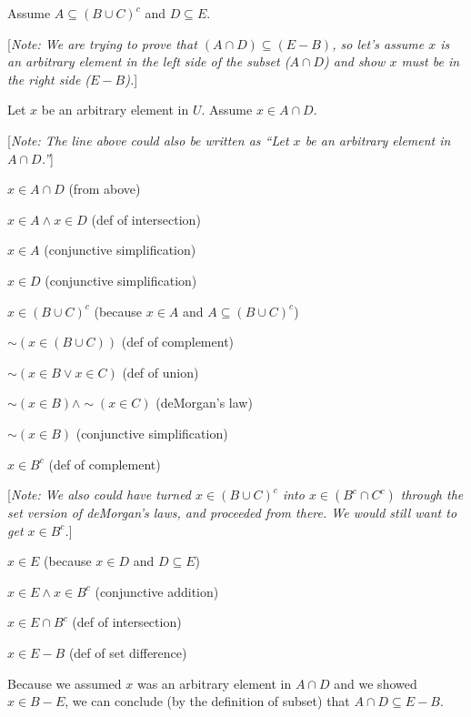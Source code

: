 \documentclass[11pt, letterpaper]{report}
\newcommand{\nott}{{\sim}}
\newcommand{\proofnote}[1]{[\textit{Note: #1}]}
\begin{document}
\begin{enumerate}
        Assume $A \subseteq (B \cup C)^c$ and $D \subseteq E$.
        
        \proofnote{We are trying to prove that $(A \cap D) \subseteq (E-B)$, so let's assume $x$ is an arbitrary element in the left side of the subset
        ($A \cap D$) and show $x$ must be in the right side ($E-B$).}
        
        Let $x$ be an arbitrary element in $U$.  Assume $x \in A \cap D$.  
        
        \proofnote{The line above could also be written as ``Let $x$ be an arbitrary element in $A\cap D$.''}

	$x \in A \cap D$ \qquad (from above)
        
    $x \in A \land  x \in D$ \qquad (def of intersection)
    
    $x \in A$ \qquad (conjunctive simplification)
    
    $x \in D$ \qquad (conjunctive simplification)
    
    $x \in (B \cup C)^c$ \qquad (because $x \in A$ and $A \subseteq (B \cup C)^c$)
    
    $\nott (x \in (B \cup C))$ \qquad (def of complement)
    
    $\nott (x \in B \lor x \in C)$ \qquad (def of union)
    
    $\nott (x \in B) \land \nott( x \in C)$ \qquad (deMorgan's law)
    
    $\nott (x \in B)$ \qquad (conjunctive simplification)
    
    $x \in B^c$ \qquad (def of complement)
    
    \proofnote{We also could have turned $x \in (B \cup C)^c$ into $x \in (B^c \cap C^c)$ through the set version of deMorgan's laws, and proceeded from there.  We would still want to get $x \in B^c$.}
    
    $x \in E$ \qquad (because $x \in D$ and $D \subseteq E$)
    
    $x \in E \land x \in B^c$ \qquad (conjunctive addition)
    
    $x \in E \cap B^c$ \qquad (def of intersection)
    
    $x \in E - B$ \qquad (def of set difference)
    
    Because we assumed $x$ was an arbitrary element in $A \cap D$ and we showed $x \in B -E$, we can conclude (by the definition of subset)
        that $A \cap D \subseteq E-B$.

	
\end{enumerate}
\end{document}
